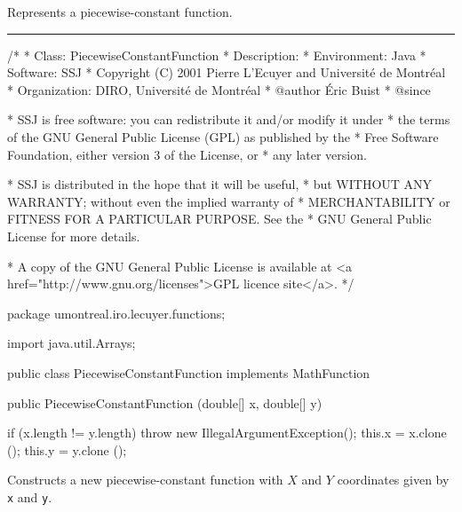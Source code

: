 

Represents a piecewise-constant function.

\bigskip\hrule

\begin{code}
\begin{hide}
/*
 * Class:        PiecewiseConstantFunction
 * Description:  
 * Environment:  Java
 * Software:     SSJ 
 * Copyright (C) 2001  Pierre L'Ecuyer and Université de Montréal
 * Organization: DIRO, Université de Montréal
 * @author       Éric Buist
 * @since

 * SSJ is free software: you can redistribute it and/or modify it under
 * the terms of the GNU General Public License (GPL) as published by the
 * Free Software Foundation, either version 3 of the License, or
 * any later version.

 * SSJ is distributed in the hope that it will be useful,
 * but WITHOUT ANY WARRANTY; without even the implied warranty of
 * MERCHANTABILITY or FITNESS FOR A PARTICULAR PURPOSE.  See the
 * GNU General Public License for more details.

 * A copy of the GNU General Public License is available at
   <a href="http://www.gnu.org/licenses">GPL licence site</a>.
 */
\end{hide}
package umontreal.iro.lecuyer.functions;\begin{hide}

import java.util.Arrays;
\end{hide}

public class PiecewiseConstantFunction implements MathFunction\begin{hide} {
   private double[] x;
   private double[] y;
\end{hide}

   public PiecewiseConstantFunction (double[] x, double[] y)\begin{hide} {
      if (x.length != y.length)
         throw new IllegalArgumentException();
      this.x = x.clone ();
      this.y = y.clone ();
   }\end{hide}
\end{code}
\begin{tabb}   Constructs a new piecewise-constant function
 with $X$ and $Y$ coordinates given
 by \texttt{x} and \texttt{y}.
\end{tabb}
\begin{htmlonly}
\end{htmlonly}
